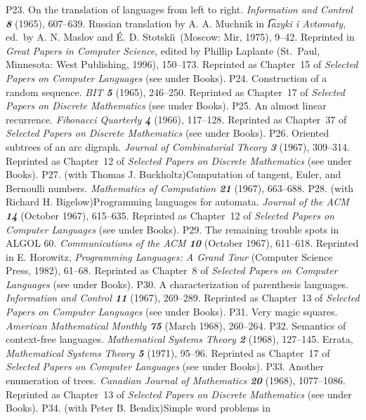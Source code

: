 \p P23.  On the translation of languages from left to right.
 {\sl Information and Control\/ \bf 8} (1965), 607--639.
 Russian translation by A. A. Muchnik in
 {\sl \t Iazyki i Avtomaty}, ed.\ by A. N. Maslov and \'E. D. Stotski\u\i\
 (Moscow: Mir, 1975), 9--42.
 Reprinted in {\sl Great Papers in Computer Science}, edited by Phillip
 Laplante (St.~Paul, Minnesota: West Publishing, 1996), 150--173.
 Reprinted as Chapter~15 of {\sl Selected Papers on
 Computer Languages\/} (see under Books).
\p P24.  Construction of a random sequence.  {\sl BIT\/ \bf 5} (1965),
 246--250.  
 Reprinted as Chapter~17 of {\sl Selected Papers on
 Discrete Mathematics\/} (see under Books).
\p P25.  An almost linear recurrence.  {\sl Fibonacci Quarterly\/ \bf 4}
 (1966), 117--128.  
 Reprinted as Chapter~37 of {\sl Selected Papers on
 Discrete Mathematics\/} (see under Books).
\p P26.  Oriented subtrees of an arc digraph.  {\sl Journal of
 Combinatorial Theory\/ \bf 3} (1967), 309--314. 
 Reprinted as Chapter~12 of {\sl Selected Papers on
 Discrete Mathematics\/} (see under Books).
\p P27.  (with Thomas J. Buckholtz)\xskip  Computation of tangent, Euler, and
 Bernoulli numbers.
 {\sl Mathematics of Computation\/ \bf 21} (1967), 663--688.
\p P28.  (with Richard H. Bigelow)\xskip  Programming languages for automata.
 {\sl Journal of the ACM\/ \bf 14} (October 1967), 615--635.  
 Reprinted as Chapter~12 of {\sl Selected Papers on
 Computer Languages\/} (see under Books).
\p P29.  The remaining trouble spots in ALGOL 60.
 {\sl Commun\-i\-ca\-tions of the ACM\/ \bf 10} (October 1967), 611--618.  
 Reprinted in E. Horowitz, {\sl Programming Languages: A Grand Tour\/}
 (Computer Science Press, 1982), 61--68.
 Reprinted as Chapter~8 of {\sl Selected Papers on
 Computer Languages\/} (see under Books).
\p P30.  A characterization of parenthesis languages.
  {\sl Information and Control\/ \bf 11} (1967), 269--289.  
 Reprinted as Chapter~13 of {\sl Selected Papers on
 Computer Languages\/} (see under Books).
\p P31.  Very magic squares.  {\sl American Mathematical
 Monthly\/ \bf 75} (March 1968), 260--264.  
\p P32.  Semantics of context-free languages.  {\sl Mathematical
 Systems Theory\/ \bf 2} (1968), 127--145.  Errata, 
 {\sl Mathematical Systems Theory\/ \bf 5} (1971), 95--96.  
 Reprinted as Chapter~17 of {\sl Selected Papers on
 Computer Languages\/} (see under Books).
\p P33.  Another enumeration of trees.  {\sl Canadian Journal
 of Mathematics\/ \bf 20} (1968), 1077--1086.  
 Reprinted as Chapter~13 of {\sl Selected Papers on
 Discrete Mathematics\/} (see under Books).
\p P34.  (with Peter B. Bendix)\xskip  Simple word problems in
